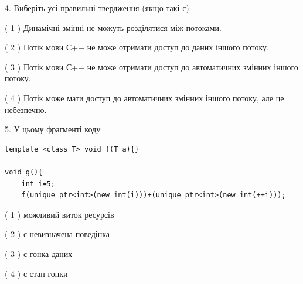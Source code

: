 \documentclass[12pt, ukrainian]{article}
\begin{document}
\begin {large}
{%
4. Виберіть усі правильні твердження (якщо такі є).\par
\vspace{2mm}

( 1 ) Динамічні змінні не можуть розділятися між потоками.%

( 2 ) Потік мови С++ не може отримати доступ до даних іншого потоку.%

( 3 ) Потік мови С++ не може отримати доступ до автоматичних змінних іншого потоку.%

( 4 ) Потік може мати доступ до автоматичних змінних іншого потоку, але це небезпечно.%


5. У цьому фрагменті коду
\begin{verbatim}
template <class T> void f(T a){}

void g(){
    int i=5;
    f(unique_ptr<int>(new int(i)))+(unique_ptr<int>(new int(++i)));
\end{verbatim}
( 1 ) можливий виток ресурсів%

( 2 ) є невизначена поведінка%

( 3 ) є гонка даних%

( 4 ) є стан гонки%
}
\end {large}
\end{document}
